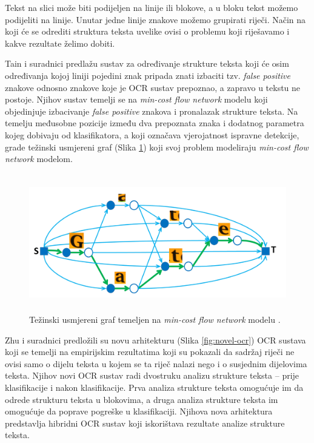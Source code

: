 \documentclass[times, utf8, zavrsni]{fer}
\begin{document}
Tekst na slici može biti podijeljen na linije ili blokove, a u bloku
tekst možemo podijeliti na linije. Unutar jedne linije znakove možemo grupirati riječi. Način na
koji će se odrediti struktura teksta uvelike ovisi o problemu koji riješavamo i kakve rezultate
želimo dobiti.

Tain i suradnici \citep{DBLP:journals/corr/TianPHLYT16} predlažu sustav za određivanje strukture teksta
koji će osim određivanja kojoj liniji pojedini znak pripada znati izbaciti tzv. \emph{false positive}
znakove odnosno znakove koje je OCR sustav prepoznao, a zapravo u tekstu ne postoje. Njihov sustav temelji
se na \emph{min-cost flow network} modelu koji objedinjuje izbacivanje \emph{false positive} znakova i
pronalazak strukture teksta. Na temelju međusobne pozicije između dva prepoznata znaka i
dodatnog parametra kojeg dobivaju od klasifikatora, a koji označava vjerojatnost ispravne detekcije, grade težinski
usmjereni graf (Slika \ref{fig:text-flow}) koji svoj problem modeliraju \emph{min-cost flow network} modelom.

\begin{figure}[htb]
    \centering
    \captionsetup{justification=centering,margin=2cm}
    \includegraphics[height=6cm]{images/text-flow.png}
    \caption{Težinski usmjereni graf temeljen na \emph{min-cost flow network} modelu \citep{DBLP:journals/corr/TianPHLYT16}.}
    \label{fig:text-flow}
\end{figure}

\pagebreak

Zhu i suradnici \citep{zhu2016novel} predložili su novu arhitekturu (Slika \ref{fig:novel-ocr}) OCR sustava koji se temelji na empirijskim
rezultatima koji su pokazali da sadržaj riječi ne ovisi samo o dijelu teksta u kojem se ta riječ
nalazi nego i o susjednim dijelovima teksta. Njihov novi OCR sustav radi dvostruku analizu strukture
teksta -- prije klasifikacije i nakon klasifikacije. Prva analiza strukture teksta omogućuje im da odrede
strukturu teksta u blokovima, a druga analiza strukture teksta im omogućuje da poprave pogreške u klasifikaciji.
Njihova nova arhitektura predstavlja hibridni OCR sustav koji iskorištava rezultate analize strukture teksta.
\end{document}
